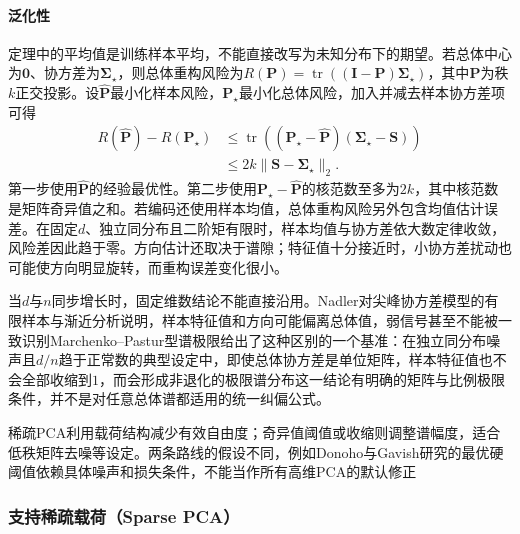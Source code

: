 \paragraph{泛化性}

定理中的平均值是训练样本平均，不能直接改写为未知分布下的期望。若总体中心为$\bm{0}$、协方差为$\bm{\Sigma}_{\star}$，则总体重构风险为$R(\bm{P})=\operatorname{tr}((\bm{I}-\bm{P})\bm{\Sigma}_{\star})$，其中$\bm{P}$为秩$k$正交投影。设$\widehat{\bm{P}}$最小化样本风险，$\bm{P}_{\star}$最小化总体风险，加入并减去样本协方差项可得
\begin{equation}
  \begin{aligned}
  R(\widehat{\bm{P}})-R(\bm{P}_{\star})
  &\leq\operatorname{tr}
      ((\bm{P}_{\star}-\widehat{\bm{P}})
        (\bm{\Sigma}_{\star}-\bm{S}))\\
  &\leq 2k\lVert\bm{S}-\bm{\Sigma}_{\star}\rVert_2.
  \end{aligned}
  \label{eq:dim-pca-excess-risk}
\end{equation}
第一步使用$\widehat{\bm{P}}$的经验最优性。第二步使用$\bm{P}_{\star}-\widehat{\bm{P}}$的核范数至多为$2k$，其中核范数是矩阵奇异值之和。若编码还使用样本均值，总体重构风险另外包含均值估计误差。在固定$d$、独立同分布且二阶矩有限时，样本均值与协方差依大数定律收敛，风险差因此趋于零。方向估计还取决于谱隙；特征值十分接近时，小协方差扰动也可能使方向明显旋转，而重构误差变化很小。

当$d$与$n$同步增长时，固定维数结论不能直接沿用。Nadler对尖峰协方差模型的有限样本与渐近分析说明，样本特征值和方向可能偏离总体值，弱信号甚至不能被一致识别Marchenko--Pastur型谱极限给出了这种区别的一个基准：在独立同分布噪声且$d/n$趋于正常数的典型设定中，即使总体协方差是单位矩阵，样本特征值也不会全部收缩到$1$，而会形成非退化的极限谱分布这一结论有明确的矩阵与比例极限条件，并不是对任意总体谱都适用的统一纠偏公式。

稀疏PCA利用载荷结构减少有效自由度；奇异值阈值或收缩则调整谱幅度，适合低秩矩阵去噪等设定。两条路线的假设不同，例如Donoho与Gavish研究的最优硬阈值依赖具体噪声和损失条件，不能当作所有高维PCA的默认修正

\subsubsection{支持稀疏载荷（Sparse PCA）}
\label{sec:dim-sparse-pca}

